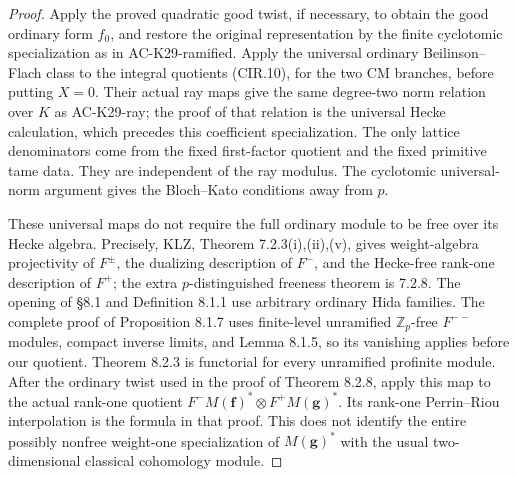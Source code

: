 \begin{proof}
Apply the proved quadratic good twist, if necessary, to obtain
the good ordinary form \(f_0\), and restore the original
representation by the finite cyclotomic specialization as in
AC-K29-ramified.  Apply the universal ordinary Beilinson--Flach
class to the integral quotients (CIR.10), for the two CM
branches, before putting \(X=0\).  Their actual ray maps give
the same degree-two norm relation over \(K\) as AC-K29-ray;
the proof of that relation is the universal Hecke calculation,
which precedes this coefficient specialization.  The only
lattice denominators come from the fixed first-factor quotient
and the fixed primitive tame data.  They are independent of
the ray modulus.  The cyclotomic universal-norm argument gives
the Bloch--Kato conditions away from \(p\).

These universal maps do not require the full ordinary module
to be free over its Hecke algebra.  Precisely, KLZ,
Theorem 7.2.3(i),(ii),(v), gives weight-algebra projectivity of
\(F^\pm\), the dualizing description of \(F^-\), and the
Hecke-free rank-one description of \(F^+\); the extra
\(p\)-distinguished freeness theorem is 7.2.8.  The opening of
\S8.1 and Definition 8.1.1 use arbitrary ordinary Hida
families.  The complete proof of Proposition 8.1.7 uses
finite-level unramified \(\mathbb Z_p\)-free \(F^{--}\)
modules, compact inverse limits, and Lemma 8.1.5, so its
vanishing applies before our quotient.  Theorem 8.2.3 is
functorial for every unramified profinite module.  After the
ordinary twist used in the proof of Theorem 8.2.8, apply this
map to the actual rank-one quotient
\(F^-M(\mathbf f)^*\otimes F^+M(\mathbf g)^*\).
Its rank-one Perrin--Riou interpolation is the formula in
that proof.  This does not identify the entire possibly
nonfree weight-one specialization of \(M(\mathbf g)^*\)
with the usual two-dimensional classical cohomology module.


\end{proof}
